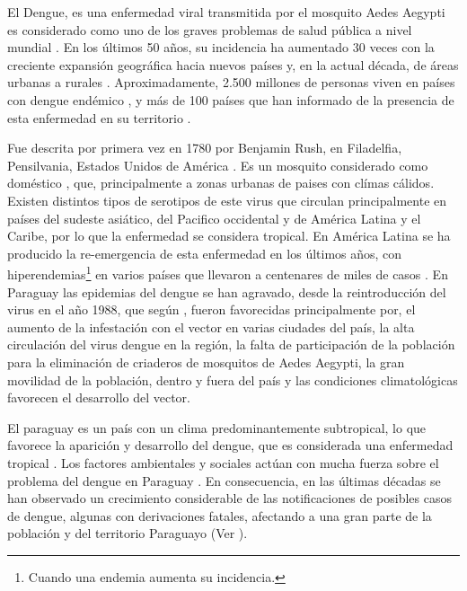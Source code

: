 
El Dengue, es una enfermedad viral transmitida por el mosquito Aedes Aegypti es considerado como
uno de los graves problemas de salud pública a nivel mundial
\citep{dengueUruguayCap1, world2009dengue}. En los últimos 50 años, su incidencia ha aumentado 30
veces con la creciente expansión geográfica hacia nuevos países y, en la actual década, de
áreas urbanas a rurales \cite{world2009dengue}. Aproximadamente, 2.500 millones de personas viven
en países con dengue endémico \cite{world2009dengue, gustavo2006dengue}, y más de 100 países que
han informado de la presencia de esta enfermedad en su territorio \cite{gustavo2006dengue}.

Fue descrita por primera vez en 1780 por Benjamin Rush, en Filadelfia, Pensilvania, Estados Unidos
de América \citep{gustavo2006dengue}. Es un mosquito considerado como doméstico
\cite{luevano1993ciclo}, que, principalmente a zonas urbanas de paises con clímas cálidos. Existen
distintos tipos de serotipos de este virus que circulan principalmente en países del sudeste
asiático, del Pacifico occidental y de América Latina y el Caribe, por lo que la enfermedad se
considera tropical\citep{gustavo2006dengue}. En América Latina se ha producido la re-emergencia de
esta enfermedad en los últimos años, con hiperendemias\footnote{ Cuando una endemia aumenta su
incidencia.} en varios países que llevaron a centenares de miles de casos \citep{dengueUruguayCap1}
. En Paraguay las epidemias del dengue se han agravado, desde la reintroducción del virus en el
año 1988, que según \cite{planControlMspbs2014}, fueron favorecidas principalmente por, el aumento
de la infestación con el vector en varias ciudades del país, la alta circulación del virus dengue
en la región, la falta de participación de la población para la eliminación de criaderos de
mosquitos de Aedes Aegypti, la gran movilidad de la población, dentro y fuera del país y las
condiciones climatológicas favorecen el desarrollo del vector.

El paraguay es un país con un clima predominantemente subtropical, lo que favorece la aparición y
desarrollo del dengue, que es considerada una enfermedad tropical \cite{gustavo2006dengue}. Los
factores ambientales y sociales actúan con mucha fuerza sobre el problema del dengue en Paraguay
\cite{website:mspbsHistoria2014}. En consecuencia, en las últimas décadas se han observado un
crecimiento considerable de las notificaciones de posibles casos de dengue, algunas con
derivaciones fatales, afectando a una gran parte de la población y del territorio Paraguayo
(Ver ).


